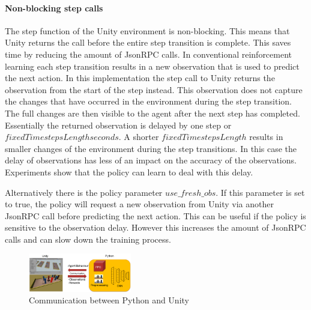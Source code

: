 \paragraph{Non-blocking step calls}
The step function of the Unity environment is non-blocking. This means that Unity returns the call before the entire step transition is complete. This saves time by reducing the amount of JsonRPC calls. In conventional reinforcement learning each step transition results in a new observation that is used to predict the next action. In this implementation the step call to Unity returns the observation from the start of the step instead. This observation does not capture the changes that have occurred in the environment during the step transition. The full changes are then visible to the agent after the next step has completed. Essentially the returned observation is delayed by one step or $fixedTimestepsLength seconds$. A shorter $fixedTimestepsLength$ results in smaller changes of the environment during the step transitions. In this case the delay of observations has less of an impact on the accuracy of the observations.
Experiments show that the policy can learn to deal with this delay.

Alternatively there is the policy parameter $use\_fresh\_obs$. If this parameter is set to true, the policy will request a new observation from Unity via another JsonRPC call before predicting the next action. This can be useful if the policy is sensitive to the observation delay. However this increases the amount of JsonRPC calls and can slow down the training process.




\begin{figure}
    \centering
    \includegraphics[width=0.4\textwidth]{Bilder/unity_communication.png}
    \caption{Communication between Python and Unity}
    \label{fig:communication_python_unity}
\end{figure} %





